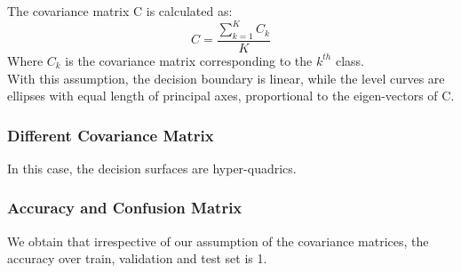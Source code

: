\documentclass[11pt,a4paper]{article}
\newcommand{\noi}{\noindent}
\begin{document}
The covariance matrix C is calculated as: 
\begin{equation}
    C = \frac{\sum_{k=1}^{K}C_{k}}{K}
\end{equation}
Where $C_{k}$ is the covariance matrix corresponding to the $k^{th}$ class.\\

\noi
With this assumption, the decision boundary is linear, while the level curves are ellipses with equal length of principal axes, proportional to the eigen-vectors of C.

\subsubsection{Different Covariance Matrix}
In this case, the decision surfaces are hyper-quadrics.


\subsubsection{Accuracy and Confusion Matrix}
We obtain that irrespective of our assumption of the covariance matrices, the accuracy over train, validation and test set is 1. 

\end{document}
